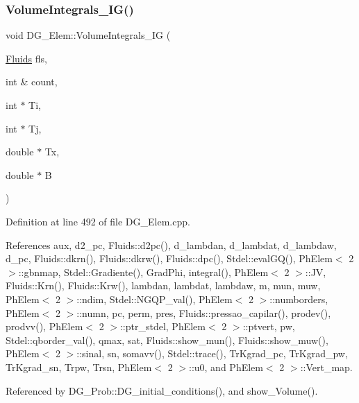 \subsubsection{\texorpdfstring{Volume\+Integrals\+\_\+\+I\+G()}{VolumeIntegrals\_IG()}}
{\footnotesize\ttfamily void D\+G\+\_\+\+Elem\+::\+Volume\+Integrals\+\_\+\+IG (\begin{DoxyParamCaption}\item[{\hyperlink{classFluids}{Fluids}}]{fls,  }\item[{int \&}]{count,  }\item[{int $\ast$}]{Ti,  }\item[{int $\ast$}]{Tj,  }\item[{double $\ast$}]{Tx,  }\item[{double $\ast$}]{B }\end{DoxyParamCaption})}



Definition at line 492 of file D\+G\+\_\+\+Elem.\+cpp.



References aux, d2\+\_\+pc, Fluids\+::d2pc(), d\+\_\+lambdan, d\+\_\+lambdat, d\+\_\+lambdaw, d\+\_\+pc, Fluids\+::dkrn(), Fluids\+::dkrw(), Fluids\+::dpc(), Stdel\+::eval\+G\+Q(), Ph\+Elem$<$ 2 $>$\+::gbnmap, Stdel\+::\+Gradiente(), Grad\+Phi, integral(), Ph\+Elem$<$ 2 $>$\+::\+JV, Fluids\+::\+Krn(), Fluids\+::\+Krw(), lambdan, lambdat, lambdaw, m, mun, muw, Ph\+Elem$<$ 2 $>$\+::ndim, Stdel\+::\+N\+G\+Q\+P\+\_\+val(), Ph\+Elem$<$ 2 $>$\+::numborders, Ph\+Elem$<$ 2 $>$\+::numn, pc, perm, pres, Fluids\+::pressao\+\_\+capilar(), prodev(), prodvv(), Ph\+Elem$<$ 2 $>$\+::ptr\+\_\+stdel, Ph\+Elem$<$ 2 $>$\+::ptvert, pw, Stdel\+::qborder\+\_\+val(), qmax, sat, Fluids\+::show\+\_\+mun(), Fluids\+::show\+\_\+muw(), Ph\+Elem$<$ 2 $>$\+::sinal, sn, somavv(), Stdel\+::trace(), Tr\+Kgrad\+\_\+pc, Tr\+Kgrad\+\_\+pw, Tr\+Kgrad\+\_\+sn, Trpw, Trsn, Ph\+Elem$<$ 2 $>$\+::u0, and Ph\+Elem$<$ 2 $>$\+::\+Vert\+\_\+map.



Referenced by D\+G\+\_\+\+Prob\+::\+D\+G\+\_\+initial\+\_\+conditions(), and show\+\_\+\+Volume().

